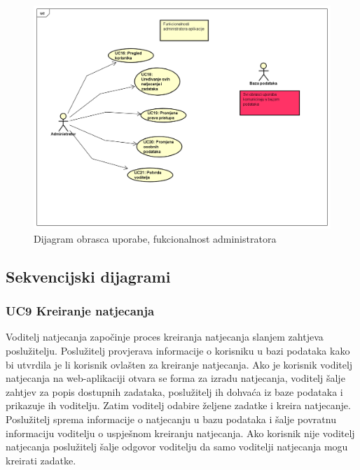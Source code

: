 					\eject
					
					\begin{figure}[H]
						\includegraphics[scale=0.5]{slike/Administrator.PNG} %
						\centering
						\caption{Dijagram obrasca uporabe, fukcionalnost administratora}
						\label{fig:obrasci2}
					\end{figure}
				\eject

			\subsection{Sekvencijski dijagrami}

				\vspace{10mm}
				\subsubsection*{UC9 Kreiranje natjecanja}
				
				Voditelj natjecanja započinje proces kreiranja natjecanja slanjem zahtjeva poslužitelju. Poslužitelj provjerava informacije o korisniku u bazi podataka kako bi utvrdila je li korisnik ovlašten za kreiranje natjecanja. Ako je korisnik voditelj natjecanja na web-aplikaciji otvara se forma za izradu natjecanja, voditelj šalje zahtjev za popis dostupnih zadataka, poslužitelj ih dohvaća iz baze podataka i prikazuje ih voditelju. Zatim voditelj odabire željene zadatke i kreira natjecanje. Poslužitelj sprema informacije o natjecanju u bazu podataka i šalje povratnu informaciju voditelju o uspješnom kreiranju natjecanja. Ako korisnik nije voditelj natjecanja poslužitelj šalje odgovor voditelju da samo voditelji natjecanja mogu kreirati zadatke.
				\vspace{20mm}

